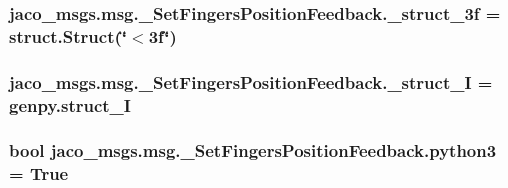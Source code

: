 \subsubsection[{\texorpdfstring{\+\_\+struct\+\_\+3f}{_struct_3f}}]{\setlength{\rightskip}{0pt plus 5cm}jaco\+\_\+msgs.\+msg.\+\_\+\+Set\+Fingers\+Position\+Feedback.\+\_\+struct\+\_\+3f = struct.\+Struct(\char`\"{}$<$3f\char`\"{})\hspace{0.3cm}{\ttfamily [private]}}\hypertarget{namespacejaco__msgs_1_1msg_1_1__SetFingersPositionFeedback_a14e03a196e67fe434a7dc299c0562686}{}\label{namespacejaco__msgs_1_1msg_1_1__SetFingersPositionFeedback_a14e03a196e67fe434a7dc299c0562686}
\subsubsection[{\texorpdfstring{\+\_\+struct\+\_\+I}{_struct_I}}]{\setlength{\rightskip}{0pt plus 5cm}jaco\+\_\+msgs.\+msg.\+\_\+\+Set\+Fingers\+Position\+Feedback.\+\_\+struct\+\_\+I = genpy.\+struct\+\_\+I\hspace{0.3cm}{\ttfamily [private]}}\hypertarget{namespacejaco__msgs_1_1msg_1_1__SetFingersPositionFeedback_a598d54fc8721a0b8146c769dae4f5d5a}{}\label{namespacejaco__msgs_1_1msg_1_1__SetFingersPositionFeedback_a598d54fc8721a0b8146c769dae4f5d5a}
\subsubsection[{\texorpdfstring{python3}{python3}}]{\setlength{\rightskip}{0pt plus 5cm}bool jaco\+\_\+msgs.\+msg.\+\_\+\+Set\+Fingers\+Position\+Feedback.\+python3 = True}\hypertarget{namespacejaco__msgs_1_1msg_1_1__SetFingersPositionFeedback_a2d4dc2ef49f7bf33e2f5c6b4ad50ac8e}{}\label{namespacejaco__msgs_1_1msg_1_1__SetFingersPositionFeedback_a2d4dc2ef49f7bf33e2f5c6b4ad50ac8e}

